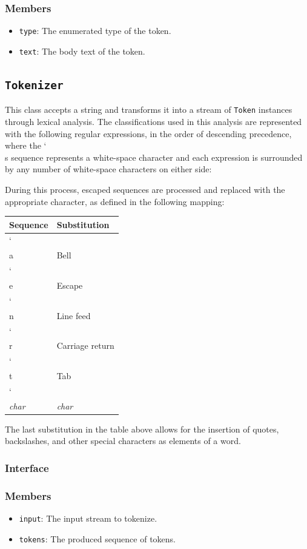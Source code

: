 \documentclass{article}
\newcommand{\bslash}{\char`\\}
\begin{document}
  \subsubsection{Members}
  \begin{itemize}
    \item \texttt{type}: The enumerated type of the token.
    \item \texttt{text}: The body text of the token.
  \end{itemize}

  \subsection{\texttt{Tokenizer}}

  This class accepts a string and transforms it into a stream of
  \texttt{Token} instances through lexical analysis.  The
  classifications used in this analysis are represented with the
  following regular expressions, in the order of descending precedence,
  where the \bslash s sequence represents a white-space character and
  each expression is surrounded by any number of white-space characters
  on either side:

  

  During this process, escaped sequences are processed and replaced with
  the appropriate character, as defined in the following mapping:

  \begin{tabular}{l|l}
    Sequence & Substitution \\
    \hline
    \bslash a & Bell \\
    \bslash e & Escape \\
    \bslash n & Line feed \\
    \bslash r & Carriage return \\
    \bslash t & Tab \\
    \bslash \emph{char} & \emph{char}
  \end{tabular}

  The last substitution in the table above allows for the insertion of
  quotes, backslashes, and other special characters as elements of a
  word.

  \subsubsection{Interface}
  

  \subsubsection{Members}
  \begin{itemize}
    \item \texttt{input}: The input stream to tokenize.
    \item \texttt{tokens}: The produced sequence of tokens.
  \end{itemize}
\end{document}
